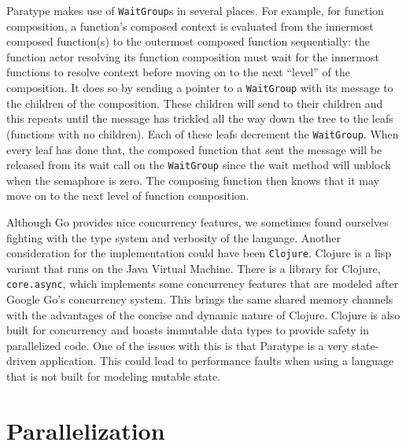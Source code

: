 \documentclass{acm_proc_article-sp}
\begin{document}
Paratype makes use of \texttt{WaitGroup}s in several places. For example, for
function composition, a function's composed context is evaluated from the
innermost composed function(s) to the outermost composed function sequentially:
the function actor resolving its function composition must wait for the
innermost functions to resolve context before moving on to the next ``level''
of the composition. It does so by sending a pointer to a \texttt{WaitGroup}
with its message to the children of the composition. These children will send
to their children and this repeats until the message has trickled all the way
down the tree to the leafs (functions with no children). Each of these leafs
decrement the \texttt{WaitGroup}. When every leaf has done that, the
composed function that sent the message will be released from its wait call on
the \texttt{WaitGroup} since the wait method will unblock when the semaphore is
zero. The composing function then knows that it may move on to the next level
of function composition.


Although Go provides nice concurrency features, we sometimes found ourselves
fighting with the type system and verbosity of the language. Another
consideration for the implementation could have been \texttt{Clojure}. Clojure
is a lisp variant that runs on the Java Virtual Machine. There is a library for
Clojure, \texttt{core.async}, which implements some concurrency features that
are  modeled after Google Go's concurrency system. This brings the same shared
memory channels with the advantages of the concise and dynamic nature of
Clojure. Clojure is also built for concurrency and boasts immutable data types
to provide safety in parallelized code. One of the issues with this is that
Paratype is a very state-driven application. This could lead to performance
faults when using a language that is not built for modeling mutable state.


\section{Parallelization}
\end{document}
